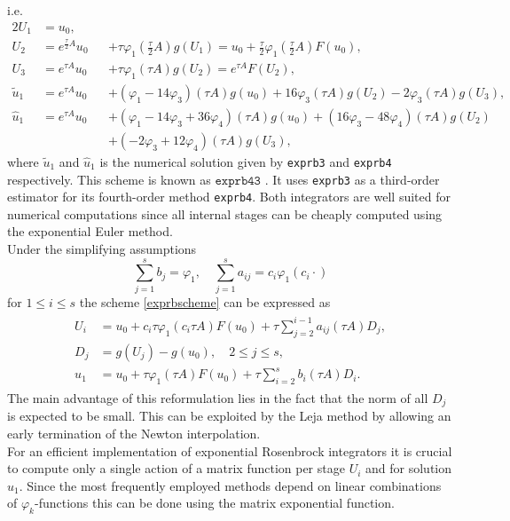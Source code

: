 \documentclass{scrartcl}
\begin{document}
	\noindent i.e. 
	\begin{alignat*}{2}
	U_{1} &= u_0,\\
	U_{2} &= e^{\frac{\tau}{2} A}u_0 &&+ \tau\varphi_1\left(\frac{\tau}{2} A\right)g(U_1) = u_0 + \frac{\tau}{2}\varphi_1\left(\frac{\tau}{2}A\right)F(u_0),\\
	U_{3} &= e^{\tau A}u_0 &&+ \tau\varphi_1(\tau A)g(U_2) = e^{\tau A}F(U_2),\\
	\tilde{u}_1 &= e^{\tau A}u_0 &&+ (\varphi_1 - 14\varphi_3)(\tau A)g(u_0) + 16\varphi_3(\tau A)g(U_2) - 2\varphi_3(\tau A)g(U_3),\\
	\hat{u}_1 &= e^{\tau A}u_0 &&+ (\varphi_1 - 14\varphi_3 + 36\varphi_4)(\tau A)g(u_0) + (16\varphi_3 -48\varphi_4)(\tau A)g(U_2) \\
	& &&+ (-2\varphi_3 + 12\varphi_4)(\tau A)g(U_3),
	\end{alignat*}
	where $\tilde{u}_1$ and $\hat{u}_1$ is the numerical solution given by \texttt{exprb3} and \texttt{exprb4} respectively.
	\noindent This scheme is known as $\texttt{exprb43}$ \cite[Example 2.24]{bible}. It uses \texttt{exprb3} as a third-order estimator for its fourth-order method \texttt{exprb4}. Both integrators are well suited for numerical computations since all internal stages can be cheaply computed using the exponential Euler method. \\
	Under the simplifying assumptions
	\[
	\sum_{j=1}^s b_j = \varphi_1, \quad  \sum_{j=1}^s a_{ij} = c_i\varphi_1(c_i\cdot) 
	\]
	for $1\le i\le s$ the scheme \eqref{exprbscheme} can be expressed as 
	\begin{align}
	\begin{split}
	U_i &= u_0 + c_i\tau\varphi_1(c_i \tau A)F(u_0) + \tau\sum_{j=2}^{i-1}a_{ij}(\tau A)D_j, \\
	D_j &= g(U_j) - g(u_0), \quad 2\le j\le s, \\
	u_1 &= u_0 +    \tau\varphi_1(    \tau A)F(u_0) + \tau\sum_{i=2}^{s}     b_i(\tau A)D_i.
	\end{split}\label{Djscheme}
	\end{align}
	The main advantage of this reformulation lies in the fact that the norm of all $D_j$ is expected to be small. This can be exploited by the Leja method by allowing an early termination of the Newton interpolation. \\
	For an efficient implementation of exponential Rosenbrock integrators it is crucial to compute only a single action of a matrix function per stage $U_i$ and for solution $u_1$. Since the most frequently employed methods depend on linear combinations of $\varphi_k$-functions this can be done using the matrix exponential function.
	
\end{document}

